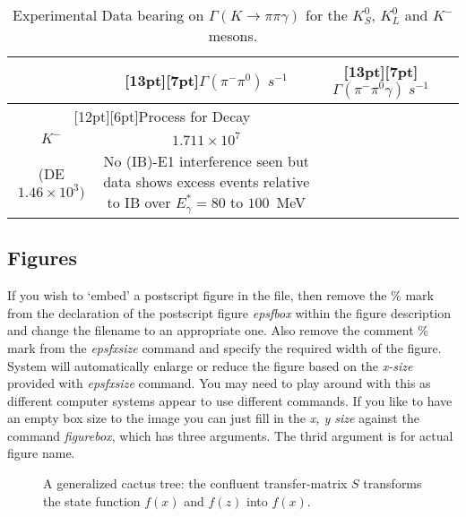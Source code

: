 \documentclass{ws-p8-50x6-00}
\begin{document}
\begin{table}[t]
\caption{Experimental Data bearing on $\Gamma(K \rightarrow \pi \pi \gamma)$
for the $K^0_S$, $K^0_L$ and $K^-$ mesons.\label{tab:exp}}
\begin{center}
\footnotesize
\begin{tabular}{|c|c|c|l|}
\hline
{} &\raisebox{0pt}[13pt][7pt]{$\Gamma(\pi^- \pi^0)\; s^{-1}$} &
\raisebox{0pt}[13pt][7pt]{$\Gamma(\pi^-\pi^0\gamma)\; s^{-1}$} &{}\\
\hline
\multicolumn{2}{|c|}{\raisebox{0pt}[12pt][6pt]{Process 
for Decay}} & &\\
\cline{1-2}
$K^-$   &$1.711 \times 10^7$ 
&\begin{minipage}{1in}
\begin{center}
$2.22 \times 10^4$ \\ (DE $ 1.46 \times 10^3)$
\end{center}\end{minipage} 
&\begin{minipage}{1.5in}
\phantom{xxx}
No (IB)-E1 interference seen but data shows excess events relative to IB over
$E^{\ast}_{\gamma} = 80$ to $100$~MeV
\end{minipage} \\[22pt]
\hline
\end{tabular}
\end{center}
\end{table}

\subsection{Figures}
If you wish to `embed' a postscript figure in the file, 
then remove the \% mark
from the declaration of the postscript figure {\em epsfbox} within the figure
description and change the filename to an appropriate one. Also
remove the comment \% mark from the {\em epsfxsize} command and specify the required width of the figure.
System will automatically enlarge or reduce the figure based on the {\em x-size} provided with {\em epsfxsize} command. 
You may need to play around with this as different computer systems
appear to use different commands. If you like to have an empty box
size to the image you can just fill in the {\em x, y size} against the
command {\em figurebox}, which has three arguments. The thrid argument
is for actual figure name.

\begin{figure}[t]
\figurebox{20pc}{15pc}{} %
\caption{A generalized cactus tree: the confluent
transfer-matrix $S$ transforms the state function $f(x)$ and
$f(z)$ into $f(x)$.  \label{fig:radish}}
\end{figure}
\end{document}
